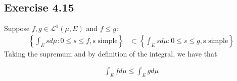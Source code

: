 \documentclass[11pt]{article}
\numberwithin{equation}{section}
\theoremstyle{plain}
\theoremstyle{definition}
\newcommand\braces[1]{\left\{ #1 \right\}}
\def\ss{\subset}
\newcommand{\1}{\mathbbm 1}
\begin{document}
\subsection*{Exercise 4.15}



Suppose $f,g \in \mathscr{L}^{1}(\mu, E)$ and $f \leq g$: 
\begin{align}
\braces{\int_{E} s d \mu: 0 \leq s \leq f, \text{s simple}} &\ss \braces{\int_{E} s d \mu: 0 \leq s \leq g, \text{s simple}}
\end{align}
Taking the supremum and by definition of the integral, we have that

\begin{align}
\int_{E} f d \mu \leq \int_{E} g d\mu
\end{align}







\end{document}
